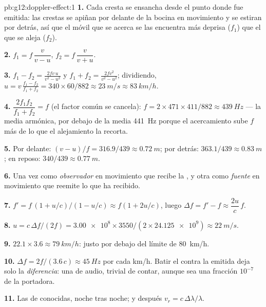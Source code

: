 \begin{solution}{pb:g12:doppler-effect:1}
\textbf{1.} Cada cresta se ensancha desde el punto donde fue emitida:
las crestas se apiñan por delante de la bocina en movimiento y se
estiran por detrás, así que el móvil que se acerca se las encuentra más
deprisa ($f_1$) que el que se aleja ($f_2$).

\textbf{2.} $f_1 = f\,\dfrac{v}{v - u}$, \quad
$f_2 = f\,\dfrac{v}{v + u}$.

\textbf{3.} $f_1 - f_2 = \frac{2fv\,u}{v^2 - u^2}$ y
$f_1 + f_2 = \frac{2fv^2}{v^2 - u^2}$; dividiendo,
$u = v\,\frac{f_1 - f_2}{f_1 + f_2} = 340 \times 60/882 \approx
\qty{23}{m/s} \approx \qty{83}{km/h}$.

\textbf{4.} $\dfrac{2f_1 f_2}{f_1 + f_2} = f$ (el factor común se
cancela): $f = 2 \times 471 \times 411/882 \approx \qty{439}{Hz}$ --- la
media armónica, por debajo de la media \qty{441}{Hz} porque el
acercamiento sube $f$ más de lo que el alejamiento la recorta.

\textbf{5.} Por delante: $(v - u)/f = 316.9/439 \approx \qty{0.72}{m}$;
por detrás: $363.1/439 \approx \qty{0.83}{m}$; en reposo:
$340/439 \approx \qty{0.77}{m}$.

\textbf{6.} Una vez como \emph{observador} en movimiento que recibe la
, y otra como \emph{fuente} en movimiento que reemite lo que ha
recibido.

\textbf{7.} $f' = f\,(1 + u/c)/(1 - u/c) \approx f(1 + 2u/c)$, luego
$\Delta f = f' - f \approx \dfrac{2u}{c}\,f$.

\textbf{8.} $u = c\,\Delta f/(2f) = \num{3.00e8} \times 3550/(2 \times
\num{24.125e9}) \approx \qty{22}{m/s}$.

\textbf{9.} $22.1 \times 3.6 \approx \qty{79}{km/h}$: justo por debajo
del límite de \qty{80}{km/h}.

\textbf{10.} $\Delta f = 2f/(3.6\,c) \approx \qty{45}{Hz}$ por cada
\unit{km/h}. Batir el  contra la  emitida deja solo la
\emph{diferencia}: una  de audio, trivial de contar, aunque
sea una fracción $10^{-7}$ de la portadora.

\textbf{11.} Las  de  conocidas,
noche tras noche; y después $v_r = c\,\Delta\lambda/\lambda$.


\end{solution}
